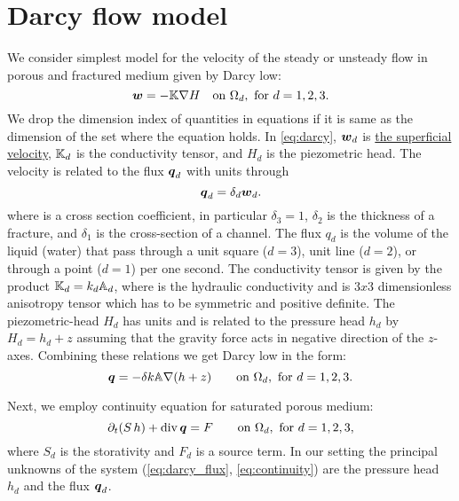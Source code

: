 
\section{Darcy flow model}
We consider simplest model for the velocity of the steady or unsteady flow in porous and fractured medium given by 
Darcy low:
\begin{equation}
    \label{eq:darcy}
    \vc w = -\tn K \grad H \quad\text{on }\Omega_d,\ \text{for $d=1,2,3$}.
\end{equation}
We drop the dimension index of quantities in equations if it is same as the dimension of the set where the equation holds.
In \eqref{eq:darcy}, $\mathbf{\boldsymbol{w}}_d$  is \href{http://en.wikipedia.org/wiki/Superficial_velocity}{the superficial velocity},
${\mathbb{K}}_d$ is the conductivity tensor, and $H_d$  is the piezometric head. The velocity is related to the flux $\mathbf{\boldsymbol{q}}_d$ 
with units  through
\[
    \mathbf{\boldsymbol{q}}_d = \delta_d \mathbf{\boldsymbol{w}}_d.
\]
where 
 is a cross section coefficient, in particular $\delta_3=1$, $\delta_2$  is the thickness of a fracture, and $\delta_1$  is the cross-section of a channel.
The flux $q_d$ is the volume of the liquid (water) that pass through a unit square ($d=3$),
unit line ($d=2$), or through a point ($d=1$) per one second. 
The conductivity tensor is given by the product 
${\mathbb{K}}_d = k_d {\mathbb{A}}_d$, where 
 is the hydraulic conductivity  and 
 is 
$3x3$ dimensionless anisotropy tensor which has to be symmetric and positive definite. The piezometric-head $H_d$ has units  and is related to the pressure head
$h_d$ by $H_d = h_d + z$ assuming that the gravity force acts in negative direction of the $z$-axes. 
Combining these relations we get Darcy low in the form:
\begin{equation}
    \label{eq:darcy_flux}
    \vc q = -\delta k\tn A \grad (h+z)  \qquad\text{on }\Omega_d,\ \text{for $d=1,2,3$}.
\end{equation}

Next, we employ continuity equation for saturated porous medium:
\begin{equation}
    \label{eq:continuity}
    \prtl_t (S\, h) + \div \vc q = F \qquad \text{on }\Omega_d,\ \text{for $d=1,2,3$},
\end{equation}
where $S_d$ is the storativity and $F_d$ is a source term. In our setting the principal unknowns of the system 
(\ref{eq:darcy_flux}, \ref{eq:continuity}) are the pressure head $h_d$ and the flux $\mathbf{\boldsymbol{q}}_d$.


